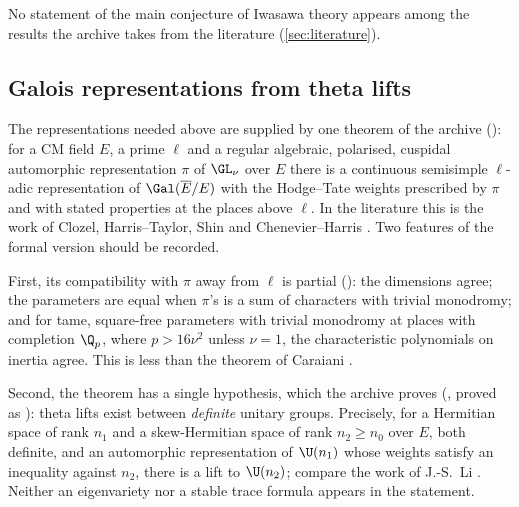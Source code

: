 No statement of the main conjecture of Iwasawa theory appears among the results the archive
takes from the literature (\cref{sec:literature}).

\subsection{Galois representations from theta lifts}\label{sec:galois}
The representations needed above are supplied by one theorem of the archive \lvS{}
(): for a CM field $E$, a prime $\ell$ and a
regular algebraic, polarised, cuspidal automorphic representation $\pi$ of $\GL_\nu$ over $E$
there is a continuous semisimple $\ell$-adic representation of $\Gal(\overline E/E)$ with the
Hodge--Tate weights prescribed by $\pi$ and with stated properties at the places above $\ell$.
In the literature this is the work of Clozel, Harris--Taylor, Shin and Chenevier--Harris
\cite{clozel1991,harristaylor2001,shin2011,chenevierharris2013}. Two features of the formal
version should be recorded.

First, its compatibility with $\pi$ away from $\ell$ is partial \lvS{} (): the
dimensions agree; the parameters are equal when $\pi$'s is a sum of characters with trivial
monodromy; and for tame, square-free parameters with trivial monodromy at places with
completion $\Q_p$, where $p>16\nu^2$ unless $\nu=1$,
the characteristic polynomials on inertia agree. This is less than the theorem of Caraiani
\cite{caraiani2012}.

Second, the theorem has a single hypothesis, which the archive proves \lvS{}
(, proved as ): theta lifts exist between \emph{definite} unitary
groups. Precisely, for a Hermitian space of rank $n_1$ and a skew-Hermitian space of rank
$n_2\ge n_0$ over $E$, both definite, and an automorphic representation of $\U(n_1)$ whose weights
satisfy an inequality against $n_2$, there is a lift to $\U(n_2)$; compare the work of J.-S.~Li
\cite{li1992}. Neither an eigenvariety nor a stable trace formula appears in the statement.
